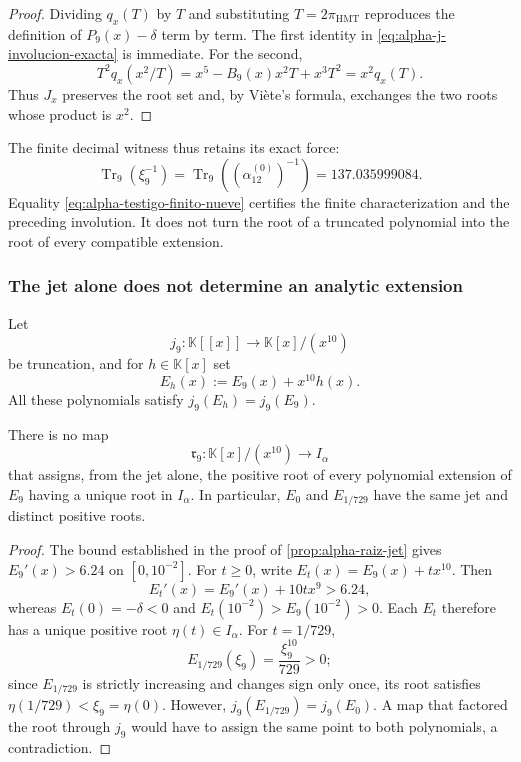 \begin{proof}
Dividing \(q_x(T)\) by \(T\) and substituting
\(T=2\pi_{\mathrm{HMT}}\) reproduces the definition of
\(P_9(x)-\delta\) term by term. The first identity in
\eqref{eq:alpha-j-involucion-exacta} is immediate. For the second,
\[
 T^2q_x(x^2/T)
 =x^5-B_9(x)x^2T+x^3T^2=x^2q_x(T).
\]
Thus \(J_x\) preserves the root set and, by Viète's formula,
exchanges the two roots whose product is \(x^2\).
\end{proof}

The finite decimal witness thus retains its exact force:
\begin{equation}
 \operatorname{Tr}_9(\xi_9^{-1})
 =\operatorname{Tr}_9\!\left((\alpha_{12}^{(0)})^{-1}\right)
 =137.035999084.
 \label{eq:alpha-testigo-finito-nueve}
\end{equation}
Equality \eqref{eq:alpha-testigo-finito-nueve} certifies the finite
characterization and the preceding involution. It does not turn the root
of a truncated polynomial into the root of every compatible extension.

\subsubsection{The jet alone does not determine an analytic extension}

Let
\[
 j_9:\mathbb K[[x]]\longrightarrow \mathbb K[x]/(x^{10})
\]
be truncation, and for \(h\in\mathbb K[x]\) set
\begin{equation}
 E_h(x):=E_9(x)+x^{10}h(x).
 \label{eq:alpha-familia-prolongaciones-mismo-jet}
\end{equation}
All these polynomials satisfy \(j_9(E_h)=j_9(E_9)\).

\begin{theorem}
\label{thm:alpha-no-unicidad-prolongacion-jet}
There is no map
\[
 \mathfrak r_9:\mathbb K[x]/(x^{10})\longrightarrow I_\alpha
\]
that assigns, from the jet alone, the positive root of every
polynomial extension of \(E_9\) having a unique root in
\(I_\alpha\). In particular, \(E_0\) and \(E_{1/729}\) have the same jet
and distinct positive roots.
\end{theorem}

\begin{proof}
The bound established in the proof of
\ref{prop:alpha-raiz-jet} gives \(E_9'(x)>6.24\) on
\([0,10^{-2}]\). For \(t\geq0\), write
\(E_t(x)=E_9(x)+tx^{10}\). Then
\[
 E_t'(x)=E_9'(x)+10tx^9>6.24,
\]
whereas \(E_t(0)=-\delta<0\) and
\(E_t(10^{-2})>E_9(10^{-2})>0\). Each \(E_t\) therefore has a unique
positive root \(\eta(t)\in I_\alpha\). For \(t=1/729\),
\[
 E_{1/729}(\xi_9)=\frac{\xi_9^{10}}{729}>0;
\]
since \(E_{1/729}\) is strictly increasing and changes sign only once,
its root satisfies \(\eta(1/729)<\xi_9=\eta(0)\). However,
\(j_9(E_{1/729})=j_9(E_0)\). A map that factored the root through
\(j_9\) would have to assign the same point to both polynomials, a contradiction.
\end{proof}

